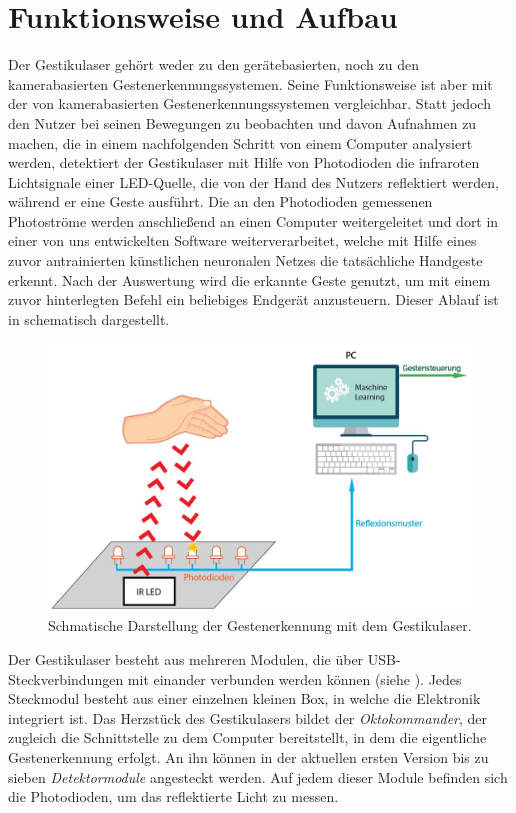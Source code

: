 \chapter{Funktionsweise und Aufbau}
\label{ch:Aufbau}

Der Gestikulaser gehört weder zu den gerätebasierten, noch zu den kamerabasierten Gestenerkennungssystemen. Seine Funktionsweise ist aber mit der von kamerabasierten Gestenerkennungssystemen vergleichbar. Statt jedoch den Nutzer bei seinen Bewegungen zu beobachten und davon Aufnahmen zu machen, die in einem nachfolgenden Schritt von einem Computer analysiert werden, detektiert der Gestikulaser mit Hilfe von Photodioden die infraroten Lichtsignale einer LED-Quelle, die von der Hand des Nutzers reflektiert werden, während er eine Geste ausführt. Die an den Photodioden gemessenen Photoströme werden anschließend an einen Computer weitergeleitet und dort in einer von uns entwickelten Software weiterverarbeitet, welche mit Hilfe eines zuvor antrainierten künstlichen neuronalen Netzes die tatsächliche Handgeste erkennt. Nach der Auswertung wird die erkannte Geste genutzt, um mit einem zuvor hinterlegten Befehl ein beliebiges Endgerät anzusteuern. Dieser Ablauf ist in  schematisch dargestellt. \\
\begin{figure}[H]
	\centering
	\includegraphics[width=14cm]{../figures/AblaufGestikulaser2.jpg}
	\caption{Schmatische Darstellung der Gestenerkennung mit dem Gestikulaser.}
	\label{fig:AblaufGestikulaser}
\end{figure}
\noindent
Der Gestikulaser besteht aus mehreren Modulen, die über USB-Steckverbindungen mit einander verbunden werden können (siehe ). Jedes Steckmodul besteht aus einer einzelnen kleinen Box, in welche die Elektronik integriert ist. Das Herzstück des Gestikulasers bildet der \textit{Oktokommander}, der zugleich die Schnittstelle zu dem Computer bereitstellt, in dem die eigentliche Gestenerkennung erfolgt. An ihn können in der aktuellen ersten Version bis zu sieben \textit{Detektormodule} angesteckt werden. Auf jedem dieser Module befinden sich die Photodioden, um das reflektierte Licht zu messen. 
